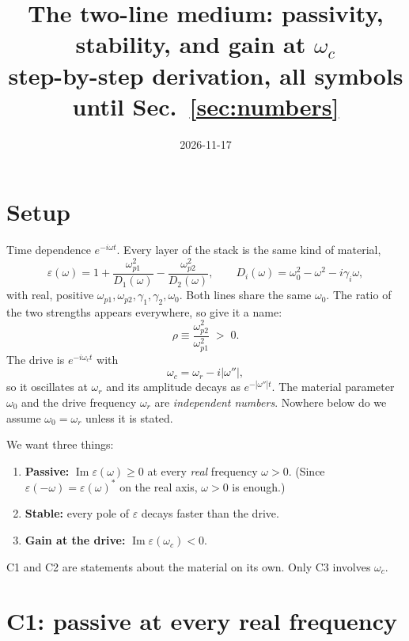 \documentclass[11pt]{article}
\title{The two-line medium: passivity, stability, and gain at $\omega_c$\\[2pt]
\large step-by-step derivation, all symbols until Sec.~\ref{sec:numbers}}
\author{}
\date{2026-11-17}
\newcommand{\wi}{|\omega''|}          %
\newcommand{\wpa}{\omega_{p1}}
\newcommand{\wpb}{\omega_{p2}}
\renewcommand{\Im}{\operatorname{Im}}
\begin{document}
\maketitle

\section{Setup}

Time dependence $e^{-i\omega t}$. Every layer of the stack is the same kind of material,
\begin{equation}
  \varepsilon(\omega) = 1 + \frac{\wpa^2}{D_1(\omega)} - \frac{\wpb^2}{D_2(\omega)},
  \qquad
  D_i(\omega) = \omega_0^2 - \omega^2 - i\gamma_i\omega ,
  \label{eq:eps}
\end{equation}
with real, positive $\wpa,\wpb,\gamma_1,\gamma_2,\omega_0$. Both lines share the same $\omega_0$.
The ratio of the two strengths appears everywhere, so give it a name:
\begin{equation}
  \rho \equiv \frac{\wpb^2}{\wpa^2} \;>\; 0 .
\end{equation}
The drive is $e^{-i\omega_c t}$ with
\begin{equation}
  \omega_c = \omega_r - i\wi ,
\end{equation}
so it oscillates at $\omega_r$ and its amplitude decays as $e^{-\wi t}$.
The material parameter $\omega_0$ and the drive frequency $\omega_r$ are \emph{independent numbers}.
Nowhere below do we assume $\omega_0=\omega_r$ unless it is stated.

\medskip
\noindent We want three things:
\begin{enumerate}[label=\textbf{C\arabic*.},leftmargin=3em]
  \item \textbf{Passive:} $\Im\varepsilon(\omega)\ge 0$ at every \emph{real} frequency $\omega>0$.
  (Since $\varepsilon(-\omega)=\varepsilon(\omega)^*$ on the real axis, $\omega>0$ is enough.)
  \item \textbf{Stable:} every pole of $\varepsilon$ decays faster than the drive.
  \item \textbf{Gain at the drive:} $\Im\varepsilon(\omega_c)<0$.
\end{enumerate}
C1 and C2 are statements about the material on its own. Only C3 involves $\omega_c$.

\section{C1: passive at every real frequency}
\end{document}
